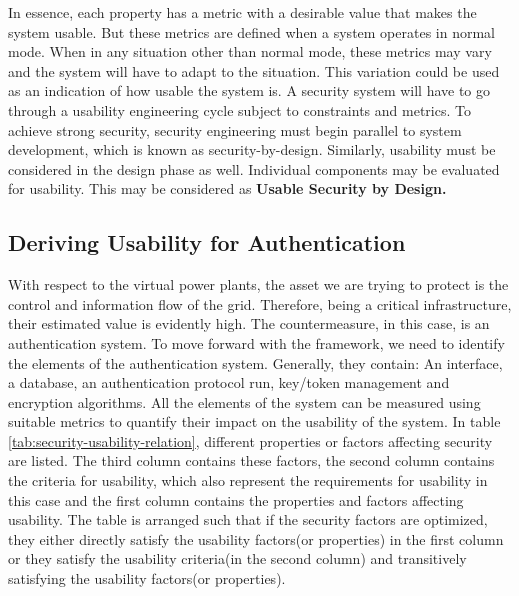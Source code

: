 In essence, each property has a metric with a desirable value that makes the system usable. But these metrics are defined when a system operates in normal mode. When in any situation other than normal mode, these metrics may vary and the system will have to adapt to the situation. This variation could be used as an indication of how usable the system is. A security system will have to go through a usability engineering cycle subject to constraints and metrics. To achieve strong security, security engineering must begin parallel to system development, which is known as security-by-design. Similarly, usability must be considered in the design phase as well. Individual components may be evaluated for usability. This may be considered as \textbf{Usable Security by Design.}


\subsection{Deriving Usability for Authentication}
With respect to the virtual power plants, the asset we are trying to protect is the control and information flow of the grid. Therefore, being a critical infrastructure, their estimated value is evidently high.   
\newline The countermeasure, in this case, is an authentication system. To move forward with the framework, we need to identify the elements of the authentication system. Generally, they contain: An interface, a database, an authentication protocol run, key/token management and encryption algorithms. All the elements of the system can be measured using suitable metrics to quantify their impact on the usability of the system. In table \ref{tab:security-usability-relation}, different properties or factors affecting security are listed. The third column contains these factors, the second column contains the criteria for usability, which also represent the requirements for usability in this case and the first column contains the properties and factors affecting usability. The table is arranged such that if the security factors are optimized, they either directly satisfy the usability factors(or properties) in the first column or they satisfy the usability criteria(in the second column) and transitively satisfying the usability factors(or properties). 


